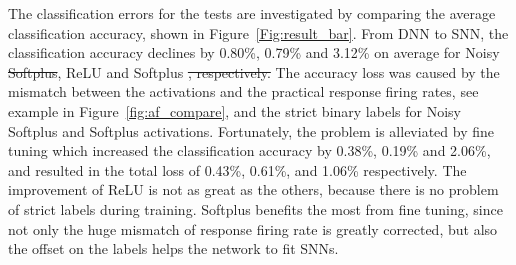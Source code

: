 \documentclass{article}
\providecommand{\DIFaddtex}[1]{{\protect\color{blue}\uwave{#1}}} %
\providecommand{\DIFdeltex}[1]{{\protect\color{red}\sout{#1}}}                      %
\providecommand{\DIFaddbegin}{} %
\providecommand{\DIFaddend}{} %
\providecommand{\DIFdelbegin}{} %
\providecommand{\DIFdelend}{} %
\providecommand{\DIFadd}[1]{\texorpdfstring{\DIFaddtex{#1}}{#1}} %
\providecommand{\DIFdel}[1]{\texorpdfstring{\DIFdeltex{#1}}{}} %
\begin{document}
	The classification errors for the tests are investigated by comparing the average classification accuracy, shown in Figure~\ref{Fig:result_bar}.
	From DNN to SNN, the classification accuracy declines by 0.80\%, 0.79\% and 3.12\% on average for Noisy \DIFdelbegin \DIFdel{Softplus}\DIFdelend \DIFaddbegin \DIFadd{softplus}\DIFaddend , ReLU and Softplus
	\DIFdelbegin \DIFdel{, respectively.
}\DIFdelend The accuracy loss was caused by the mismatch between the activations and the practical response firing rates, see example in Figure~\ref{fig:af_compare}, and the strict binary labels for Noisy Softplus and Softplus activations.
	Fortunately, the problem is alleviated by fine tuning which increased the classification accuracy by 0.38\%, 0.19\% and 2.06\%, and resulted in the total loss of 0.43\%, 0.61\%, and 1.06\% respectively.
	The improvement of ReLU is not as great as the others, because there is no problem of strict labels during training.
	Softplus benefits the most from fine tuning, since not only the huge mismatch of response firing rate is greatly corrected, but also the offset on the labels helps the network to fit SNNs. 

\end{document}
